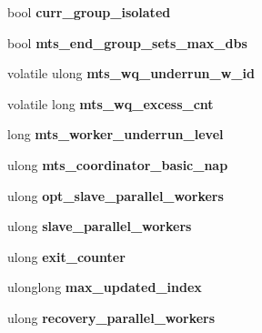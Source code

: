 \begin{DoxyCompactItemize}
bool {\bfseries curr\+\_\+group\+\_\+isolated}
\item 
\mbox{\label{classRelay__log__info_af3d64d528e0e39a8cbbc406590e60a72}} 
bool {\bfseries mts\+\_\+end\+\_\+group\+\_\+sets\+\_\+max\+\_\+dbs}
\item 
\mbox{\label{classRelay__log__info_a5b89dfc26a74c0fc0888948b38be5893}} 
volatile ulong {\bfseries mts\+\_\+wq\+\_\+underrun\+\_\+w\+\_\+id}
\item 
\mbox{\label{classRelay__log__info_a1e42ba28e35b35f852129277ad2310a6}} 
volatile long {\bfseries mts\+\_\+wq\+\_\+excess\+\_\+cnt}
\item 
\mbox{\label{classRelay__log__info_aa1465e6e9f69406bd28330548d46b5e6}} 
long {\bfseries mts\+\_\+worker\+\_\+underrun\+\_\+level}
\item 
\mbox{\label{classRelay__log__info_a304cdfb16d97ae3148a4f0be59e55883}} 
ulong {\bfseries mts\+\_\+coordinator\+\_\+basic\+\_\+nap}
\item 
\mbox{\label{classRelay__log__info_ae67a40918ed5af5463e43fc3cbac3248}} 
ulong {\bfseries opt\+\_\+slave\+\_\+parallel\+\_\+workers}
\item 
\mbox{\label{classRelay__log__info_aaebd1027e22891f20b73ee1553b641f6}} 
ulong {\bfseries slave\+\_\+parallel\+\_\+workers}
\item 
\mbox{\label{classRelay__log__info_a5524feabb3d2102a396b4e308dbcc3eb}} 
ulong {\bfseries exit\+\_\+counter}
\item 
\mbox{\label{classRelay__log__info_a18b91a34e702cace64bc95f30bf3a5f5}} 
ulonglong {\bfseries max\+\_\+updated\+\_\+index}
\item 
\mbox{\label{classRelay__log__info_af8172590d5f51906f8f5edee3f163f4a}} 
ulong {\bfseries recovery\+\_\+parallel\+\_\+workers}
\item 
\mbox{\label{classRelay__log__info_a224388b22aff285ae32e0e76e8e256fe}} 

\end{DoxyCompactItemize}
